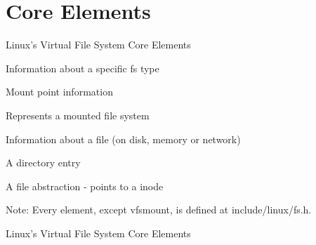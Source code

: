 \documentclass{beamer}
\begin{document}
\section{Core Elements}

\begin{frame}{Linux's Virtual File System Core Elements}

	\begin{description}[<+->]\itemsep4pt
			
		\item[file\_system\_type]{Information about a specific fs type}
		\item[vfsmount]{Mount point information}		
		\item[super\_block]{Represents a mounted file system}
		\item[inode]{Information about a file (on disk, memory or network)}
		\item[dentry]{A directory entry}
		\item[file]{A file abstraction - points to a inode}

		\vspace{15pt}

		\item{Note: Every element, except vfsmount, is defined at include/linux/fs.h.}

	\end{description}

\end{frame}

\begin{frame}{Linux's Virtual File System Core Elements}
	

\end{frame}
\end{document}
